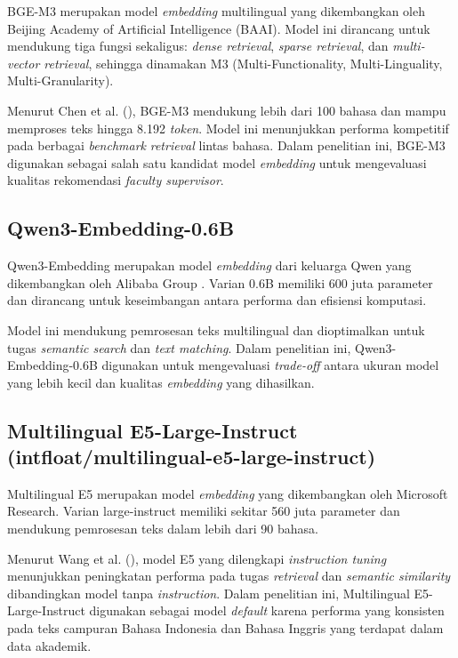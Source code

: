 BGE-M3 merupakan model \textit{embedding} multilingual yang dikembangkan oleh Beijing Academy of Artificial Intelligence (BAAI). Model ini dirancang untuk mendukung tiga fungsi sekaligus: \textit{dense retrieval}, \textit{sparse retrieval}, dan \textit{multi-vector retrieval}, sehingga dinamakan M3 (Multi-Functionality, Multi-Linguality, Multi-Granularity).

Menurut Chen et al. (\citeyear{chen2024bgem3}), BGE-M3 mendukung lebih dari 100 bahasa dan mampu memproses teks hingga 8.192 \textit{token}. Model ini menunjukkan performa kompetitif pada berbagai \textit{benchmark} \textit{retrieval} lintas bahasa. Dalam penelitian ini, BGE-M3 digunakan sebagai salah satu kandidat model \textit{embedding} untuk mengevaluasi kualitas rekomendasi \textit{faculty supervisor}.

\subsection{Qwen3-Embedding-0.6B}\label{qwen3-embedding-0.6b}

Qwen3-Embedding merupakan model \textit{embedding} dari keluarga Qwen yang dikembangkan oleh Alibaba Group \cite{qwen3embedding}. Varian 0.6B memiliki 600 juta parameter dan dirancang untuk keseimbangan antara performa dan efisiensi komputasi.

Model ini mendukung pemrosesan teks multilingual dan dioptimalkan untuk tugas \textit{semantic search} dan \textit{text matching}. Dalam penelitian ini, Qwen3-Embedding-0.6B digunakan untuk mengevaluasi \textit{trade-off} antara ukuran model yang lebih kecil dan kualitas \textit{embedding} yang dihasilkan.

\subsection{Multilingual E5-Large-Instruct (intfloat/multilingual-e5-large-instruct)}\label{multilingual-e5-large-instruct-intfloatmultilingual-e5-large-instruct}

Multilingual E5 merupakan model \textit{embedding} yang dikembangkan oleh Microsoft Research. Varian large-instruct memiliki sekitar 560 juta parameter dan mendukung pemrosesan teks dalam lebih dari 90 bahasa.

Menurut Wang et al. (\citeyear{wang2024e5}), model E5 yang dilengkapi \textit{instruction tuning} menunjukkan peningkatan performa pada tugas \textit{retrieval} dan \textit{semantic similarity} dibandingkan model tanpa \textit{instruction}. Dalam penelitian ini, Multilingual E5-Large-Instruct digunakan sebagai model \textit{default} karena performa yang konsisten pada teks campuran Bahasa Indonesia dan Bahasa Inggris yang terdapat dalam data akademik.

